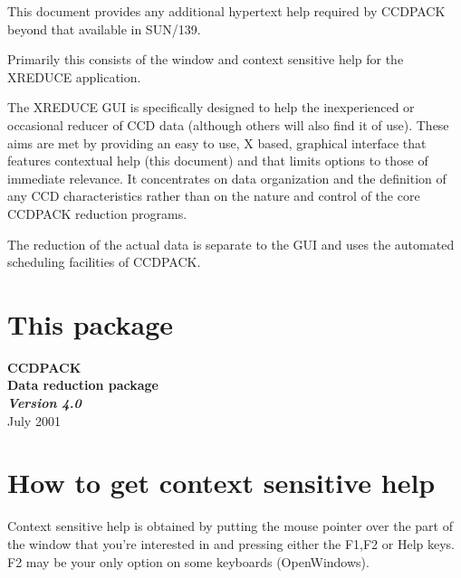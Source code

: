 \documentclass[11pt]{article}
\newcommand{\stardocinitials}  {HRH}
\newcommand{\stardocnumber}    {1.0}
\newcommand{\stardocdate}      {July 2001}
\newcommand{\stardocversion}   {Version 4.0}
\newcommand{\stardocname}{\stardocinitials /\stardocnumber}
\newenvironment{latexonly}{}{}
\newcommand{\xref}[3]{#1}
\newcommand{\xlabel}[1]{}
\begin{document}
This document provides any additional hypertext help required by
\xref{CCDPACK}{sun139}{} beyond that available in SUN/139.

Primarily this consists of the window and context sensitive help
for the \xref{XREDUCE}{sun139}{XREDUCE} application.

The XREDUCE GUI is specifically designed to help the inexperienced or
occasional reducer of CCD data (although others will also find it of
use). These aims are met by providing an easy to use, X based,
graphical interface that features contextual help (this document) and
that limits options to those of immediate relevance. It concentrates
on data organization and the definition of any CCD characteristics
rather than on the nature and control of the core CCDPACK reduction
programs.

The reduction of the actual data is separate to the GUI and uses the
automated scheduling facilities of CCDPACK.


\begin{latexonly}
  \setlength{\parskip}{0mm}
  \tableofcontents
  \setlength{\parskip}{\medskipamount}
  \markright{\stardocname}
\end{latexonly}
\section{This package \xlabel{OnVersion}}
\begin{center}
{\Huge \bf  CCDPACK \\
\LARGE Data reduction package \\
\Large \em \stardocversion \\
}
\stardocdate
\end{center}

\section{How to get context sensitive help \xlabel{OnContext}}
Context sensitive help is obtained by putting the mouse pointer over
the part of the window that you're interested in and pressing either
the F1,F2 or Help keys. F2 may be your only option on some keyboards
(OpenWindows).
\end{document}
